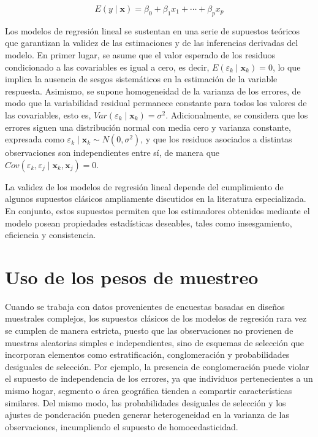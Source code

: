 \documentclass[
  spanish,
  12pt,
]{book}
\begin{document}
\[
E(y \mid \mathbf{x}) = {\beta}_{0} + {\beta}_{1}x_{1} + \cdots + {\beta}_{p}x_{p}
\]

Los modelos de regresión lineal se sustentan en una serie de supuestos teóricos que garantizan la validez de las estimaciones y de las inferencias derivadas del modelo. En primer lugar, se asume que el valor esperado de los residuos condicionado a las covariables es igual a cero, es decir, \(E(\varepsilon_{k} \mid \mathbf{x}_{k}) = 0\), lo que implica la ausencia de sesgos sistemáticos en la estimación de la variable respuesta. Asimismo, se supone homogeneidad de la varianza de los errores, de modo que la variabilidad residual permanece constante para todos los valores de las covariables, esto es, \(Var(\varepsilon_{k} \mid \mathbf{x}_{k}) = \sigma^2\). Adicionalmente, se considera que los errores siguen una distribución normal con media cero y varianza constante, expresada como \(\varepsilon_{k} \mid \mathbf{x}_{k} \sim N(0,\sigma^2)\), y que los residuos asociados a distintas observaciones son independientes entre sí, de manera que \(Cov(\varepsilon_{k},\varepsilon_{j}\mid \mathbf{x}_{k},\mathbf{x}_{j})=0\).

La validez de los modelos de regresión lineal depende del cumplimiento de algunos supuestos clásicos ampliamente discutidos en la literatura especializada. En conjunto, estos supuestos permiten que los estimadores obtenidos mediante el modelo posean propiedades estadísticas deseables, tales como insesgamiento, eficiencia y consistencia.

\section{Uso de los pesos de muestreo}\label{uso-de-los-pesos-de-muestreo}

Cuando se trabaja con datos provenientes de encuestas basadas en diseños muestrales complejos, los supuestos clásicos de los modelos de regresión rara vez se cumplen de manera estricta, puesto que las observaciones no provienen de muestras aleatorias simples e independientes, sino de esquemas de selección que incorporan elementos como estratificación, conglomeración y probabilidades desiguales de selección. Por ejemplo, la presencia de conglomeración puede violar el supuesto de independencia de los errores, ya que individuos pertenecientes a un mismo hogar, segmento o área geográfica tienden a compartir características similares. Del mismo modo, las probabilidades desiguales de selección y los ajustes de ponderación pueden generar heterogeneidad en la varianza de las observaciones, incumpliendo el supuesto de homocedasticidad.
\end{document}
